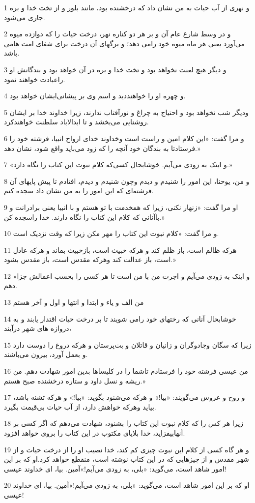 \par 1 و نهری از آب حیات به من نشان داد که درخشنده بود، مانند بلور و از تخت خدا و بره جاری می‌شود.
\par 2 و در وسط شارع عام آن و بر هر دو کناره نهر، درخت حیات را که دوازده میوه می‌آورد یعنی هر ماه میوه خود رامی دهد؛ و برگهای آن درخت برای شفای امت هامی باشد.
\par 3 و دیگر هیچ لعنت نخواهد بود و تخت خدا و بره در آن خواهد بود و بندگانش او راعبادت خواهند نمود.
\par 4 و چهره او را خواهنددید و اسم وی بر پیشانی‌ایشان خواهد بود.
\par 5 ودیگر شب نخواهد بود و احتیاج به چراغ و نورآفتاب ندارند، زیرا خداوند خدا بر ایشان روشنایی می‌بخشد و تا ابدالاباد سلطنت خواهندکرد.
\par 6 و مرا گفت: «این کلام امین و راست است وخداوند خدای ارواح انبیا، فرشته خود را فرستادتا به بندگان خود آنچه را که زود می‌باید واقع شود، نشان دهد.»
\par 7 «و اینک به زودی می‌آیم. خوشابحال کسی‌که کلام نبوت این کتاب را نگاه دارد.»
\par 8 و من، یوحنا، این امور را شنیدم و دیدم وچون شنیدم و دیدم، افتادم تا پیش پایهای آن فرشته‌ای که این امور را به من نشان داد سجده کنم.
\par 9 او مرا گفت: «زنهار نکنی، زیرا که همخدمت با تو هستم و با انبیا یعنی برادرانت و باآنانی که کلام این کتاب را نگاه دارند. خدا راسجده کن.»
\par 10 و مرا گفت: «کلام نبوت این کتاب را مهر مکن زیرا که وقت نزدیک است.
\par 11 هر‌که ظالم است، باز ظلم کند و هر‌که خبیث است، بازخبیث بماند و هر‌که عادل است، باز عدالت کند وهر‌که مقدس است، باز مقدس بشود.»
\par 12 «و اینک به زودی می‌آیم و اجرت من با من است تا هر کسی را بحسب اعمالش جزا دهم.
\par 13 من الف و یاء و ابتدا و انتها و اول و آخر هستم
\par 14 خوشابحال آنانی که رختهای خود رامی شویند تا بر درخت حیات اقتدار یابند و به دروازه های شهر درآیند،
\par 15 زیرا که سگان وجادوگران و زانیان و قاتلان و بت‌پرستان و هر‌که دروغ را دوست دارد و بعمل آورد، بیرون می‌باشند.
\par 16 من عیسی فرشته خود را فرستادم تاشما را در کلیساها بدین امور شهادت دهم. من ریشه و نسل داود و ستاره درخشنده صبح هستم.»
\par 17 و روح و عروس می‌گویند: «بیا!» و هر‌که می‌شنود بگوید: «بیا!» و هر‌که تشنه باشد، بیاید وهر‌که خواهش دارد، از آب حیات بی‌قیمت بگیرد.
\par 18 زیرا هر کس را که کلام نبوت این کتاب را بشنود، شهادت می‌دهم که اگر کسی بر آنهابیفزاید، خدا بلایای مکتوب در این کتاب را بروی خواهد افزود.
\par 19 و هر گاه کسی از کلام این نبوت چیزی کم کند، خدا نصیب او را از درخت حیات و از شهر مقدس و از چیزهایی که در این کتاب نوشته است، منقطع خواهد کرد.او که بر این امور شاهد است، می‌گوید: «بلی، به زودی می‌آیم!»آمین. بیا، ای خداوند عیسی!
\par 20 او که بر این امور شاهد است، می‌گوید: «بلی، به زودی می‌آیم!»آمین. بیا، ای خداوند عیسی!



